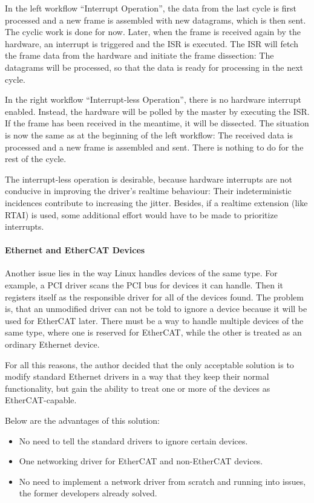 \documentclass[a4paper,12pt,BCOR6mm,bibtotoc,idxtotoc]{scrbook}
\begin{document}
In the left workflow ``Interrupt Operation'', the data from the last cycle is
first processed and a new frame is assembled with new datagrams, which is then
sent.  The cyclic work is done for now.  Later, when the frame is received
again by the hardware, an interrupt is triggered and the ISR is executed. The
ISR will fetch the frame data from the hardware and initiate the frame
dissection: The datagrams will be processed, so that the data is ready for
processing in the next cycle.

In the right workflow ``Interrupt-less Operation'', there is no hardware
interrupt enabled.  Instead, the hardware will be polled by the master by
executing the ISR. If the frame has been received in the meantime, it will be
dissected. The situation is now the same as at the beginning of the left
workflow: The received data is processed and a new frame is assembled and
sent. There is nothing to do for the rest of the cycle.

The interrupt-less operation is desirable, because hardware interrupts are not
conducive in improving the driver's realtime behaviour: Their indeterministic
incidences contribute to increasing the jitter. Besides, if a realtime
extension (like RTAI) is used, some additional effort would have to be made to
prioritize interrupts.

\paragraph{Ethernet and EtherCAT Devices} Another issue lies in the way Linux
handles devices of the same type.  For example, a
PCI driver
scans the PCI bus for devices it can handle. Then it registers itself as the
responsible driver for all of the devices found. The problem is, that an
unmodified driver can not be told to ignore a device because it will be used
for EtherCAT later. There must be a way to handle multiple devices of the same
type, where one is reserved for EtherCAT, while the other is treated as an
ordinary Ethernet device.

For all this reasons, the author decided that the only acceptable solution is
to modify standard Ethernet drivers in a way that they keep their normal
functionality, but gain the ability to treat one or more of the devices as
EtherCAT-capable.

Below are the advantages of this solution:

\begin{itemize}
\item No need to tell the standard drivers to ignore certain devices.
\item One networking driver for EtherCAT and non-EtherCAT devices.
\item No need to implement a network driver from scratch and running
  into issues, the former developers already solved.
\end{itemize}
\end{document}
